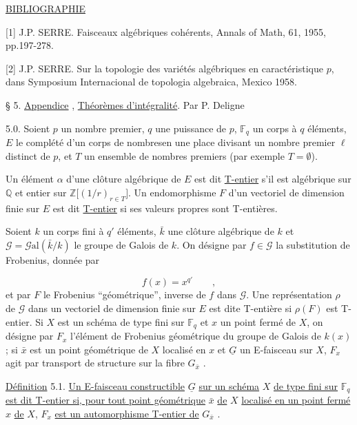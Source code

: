 \underline{BIBLIOGRAPHIE}

[1]  J.P.  SERRE.  Faisceaux algébriques cohérents, Annals of Math, 61, 1955, pp.197-278.

[2]  J.P.  SERRE.  Sur la topologie des variétés algébriques en caractéristique $p$, dans Symposium Internacional de topologia algebraica, Mexico 1958.




§ 5. \underline{Appendice} , \underline{Théorèmes d'intégralité}. Par P. Deligne

5.0. Soient $p$ un nombre premier, $q$ une puissance de $p$, $\mathbb{F}_q$ un corps à $q$ éléments, $E$ le complété d'un corps de nombresen une place divisant un nombre premier $\ell$ distinct de $p$, et $T$ un ensemble de nombres premiers (par exemple $T = \emptyset$).

Un élément $\alpha$ d'une clôture algébrique de $E$ est dit \underline{T-entier} s'il est algébrique sur $\mathbb{Q}$ et entier sur $\mathbb{Z}\bigl[(1/r)_{r \in T}\bigr]$. Un endomorphisme $F$ d'un vectoriel de dimension finie sur $E$ est dit \underline{T-entier} si ses valeurs propres sont T-entières.

Soient $k$ un corps fini à $q'$ éléments, $\bar{k}$ une clôture algébrique de $k$ et $\mathcal{G} = \mathcal{G}\mathrm{al}(\bar{k}/k)$ le groupe de Galois de $k$. On désigne par $f \in \mathcal{G}$ la substitution de Frobenius, donnée par

\begin{equation*}
f(x) = x^{q'} \qquad ,
\end{equation*}
et par $F$ le Frobenius ``géométrique'', inverse de $f$ dans $\mathcal{G}$. Une représentation $\rho$ de $\mathcal{G}$ dans un vectoriel de dimension finie sur $E$ est dite T-entière si $\rho(F)$ est T-entier. Si $X$ est un schéma de type fini sur $\mathbb{F}_q$ et $x$ un point fermé de $X$, on désigne par $F_x$ l'élément de Frobenius géométrique du groupe de Galois de $k(x)$ ; si $\bar{x}$ est un point géométrique de $X$ localisé en $x$ et $\underline{G}$ un E-faisceau sur $X$, $F_x$ agit par transport de structure sur la fibre $G_{\bar{x}}$ .

\underline{Définition} 5.1. \underline{Un E-faisceau constructible} $\underline{G}$ \underline{sur un schéma} $X$ \underline{de type fini sur} $\mathbb{F}_q$ \underline{est dit T-entier si, pour tout point géométrique} $\bar{x}$ \underline{de} $X$ \underline{localisé en un point fermé} $x$ \underline{de} $X$, $F_x$ \underline{est un automorphisme T-entier de} $G_{\bar{x}}$ .


